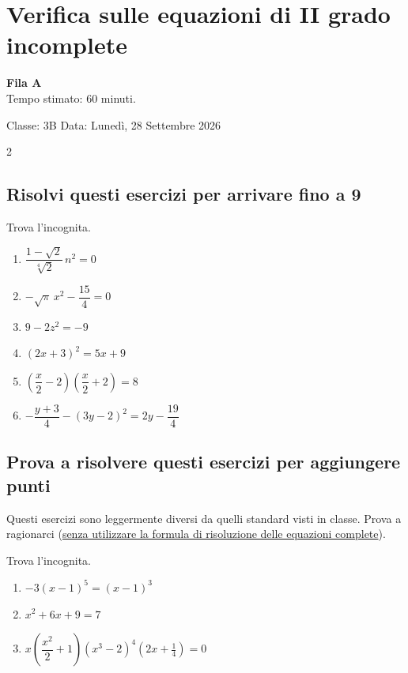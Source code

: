\documentclass[11pt]{report}
\begin{document}
\chapter*{Verifica sulle equazioni di II grado incomplete}
\begin{flushright}
    \textbf{Fila A}\\
    Tempo stimato: 60 minuti.
\end{flushright}

\begin{flushright}
    Classe: 3B \quad Data: Lunedì, 28 Settembre 2026
\end{flushright} 

\vspace{0.8em}
\regoladoro
\begin{paracol}{2}
    
\section*{Risolvi questi esercizi per arrivare fino a 9}
Trova l'incognita.
\begin{enumerate}
    \item $\dfrac{1-\sqrt2}{\sqrt[4]2}\,n^2=0$
    \item $-\sqrt\pi\,x^2-\dfrac{15}{4}=0$
    \item $9-2z^2=-9$
    \item $(2x+3)^2=5x+9$
    \item $\left(\dfrac x2-2\right)\left(\dfrac x2+2\right)=8$
    \item $-\dfrac{y+3}{4} - (3y-2)^2 = 2y - \dfrac{19}{4}$
\end{enumerate}
\switchcolumn

\section*{Prova a risolvere questi esercizi per aggiungere punti}
Questi esercizi sono leggermente diversi da quelli standard visti in classe. Prova a ragionarci (\ul{senza utilizzare la formula di risoluzione delle equazioni complete}).

Trova l'incognita.

\begin{enumerate}
    \item[7.] $-3(x-1)^5=(x-1)^3$
    \item[8.] $x^2+6x+9=7$
    \item[9.] $x\left(\dfrac {x^2}2 +1\right)(x^3-2)^4\left(2x+\frac14\right)=0$
\end{enumerate}
\end{paracol}
\end{document}

